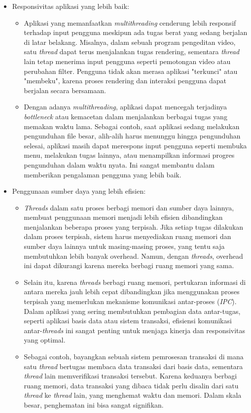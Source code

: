 \documentclass[12pt]{article}
\begin{document}
\begin{itemize}
    \item Responsivitas aplikasi yang lebih baik:
    \begin{itemize}
        \item Aplikasi yang memanfaatkan \textit{multithreading} cenderung lebih responsif terhadap input pengguna meskipun ada tugas berat yang sedang berjalan di latar belakang. Misalnya, dalam sebuah program pengeditan video, satu \textit{thread} dapat terus menjalankan tugas rendering, sementara \textit{thread} lain tetap menerima input pengguna seperti pemotongan video atau perubahan filter. Pengguna tidak akan merasa aplikasi "terkunci" atau "membeku", karena proses rendering dan interaksi pengguna dapat berjalan secara bersamaan.
        \item Dengan adanya \textit{multithreading}, aplikasi dapat mencegah terjadinya \textit{bottleneck} atau kemacetan dalam menjalankan berbagai tugas yang memakan waktu lama. Sebagai contoh, saat aplikasi sedang melakukan pengunduhan file besar, alih-alih harus menunggu hingga pengunduhan selesai, aplikasi masih dapat merespons input pengguna seperti membuka menu, melakukan tugas lainnya, atau menampilkan informasi progres pengunduhan dalam waktu nyata. Ini sangat membantu dalam memberikan pengalaman pengguna yang lebih baik.
    \end{itemize}
    
    \item Penggunaan sumber daya yang lebih efisien:
    \begin{itemize}
        \item \textit{Threads} dalam satu proses berbagi memori dan sumber daya lainnya, membuat penggunaan memori menjadi lebih efisien dibandingkan menjalankan beberapa proses yang terpisah. Jika setiap tugas dilakukan dalam proses terpisah, sistem harus menyediakan ruang memori dan sumber daya lainnya untuk masing-masing proses, yang tentu saja membutuhkan lebih banyak overhead. Namun, dengan \textit{threads}, overhead ini dapat dikurangi karena mereka berbagi ruang memori yang sama.
        \item Selain itu, karena \textit{threads} berbagi ruang memori, pertukaran informasi di antara mereka jauh lebih cepat dibandingkan jika menggunakan proses terpisah yang memerlukan mekanisme komunikasi antar-proses (\textit{IPC}). Dalam aplikasi yang sering membutuhkan pembagian data antar-tugas, seperti aplikasi basis data atau sistem transaksi, efisiensi komunikasi antar-\textit{threads} ini sangat penting untuk menjaga kinerja dan responsivitas yang optimal.
        \item Sebagai contoh, bayangkan sebuah sistem pemrosesan transaksi di mana satu \textit{thread} bertugas membaca data transaksi dari basis data, sementara \textit{thread} lain memverifikasi transaksi tersebut. Karena keduanya berbagi ruang memori, data transaksi yang dibaca tidak perlu disalin dari satu \textit{thread} ke \textit{thread} lain, yang menghemat waktu dan memori. Dalam skala besar, penghematan ini bisa sangat signifikan.
    \end{itemize}
    

\end{itemize}
\end{document}
